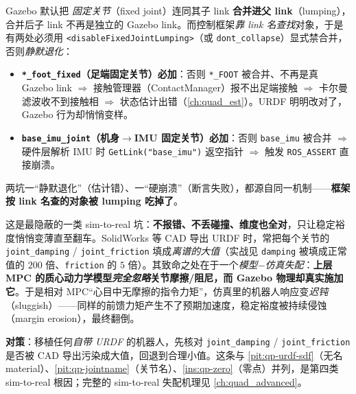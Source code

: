 \begin{pitfall}\label{pit:qp-fixed-lumping}
Gazebo 默认把 \emph{固定关节}（fixed joint）连同其子 link \textbf{合并进父 link}（lumping），合并后子 link 不再是独立的 Gazebo link。而控制框架\emph{靠 link 名查找}对象，于是有两处必须用 \texttt{<disableFixedJointLumping>}（或 \texttt{dont\_collapse}）显式禁合并，否则\emph{静默退化}\cite{sleiman2021unified}：
\begin{itemize}
  \item \textbf{\texttt{*\_foot\_fixed}（足端固定关节）必加}：否则 \texttt{*\_FOOT} 被合并、不再是真 Gazebo link $\Rightarrow$ 接触管理器（ContactManager）报不出足端接触 $\Rightarrow$ 卡尔曼滤波收不到接触相 $\Rightarrow$ 状态估计出错（\cref{ch:quad_est}）。URDF 明明改对了，Gazebo 行为却悄悄变样。
  \item \textbf{\texttt{base\_imu\_joint}（机身$\to$IMU 固定关节）必加}：否则 \texttt{base\_imu} 被合并 $\Rightarrow$ 硬件层解析 IMU 时 \texttt{GetLink("base\_imu")} 返空指针 $\Rightarrow$ 触发 \texttt{ROS\_ASSERT} 直接崩溃。
\end{itemize}
两坑一“静默退化”（估计错）、一“硬崩溃”（断言失败），都源自同一机制——\textbf{框架按 link 名查的对象被 lumping 吃掉了}。
\end{pitfall}

\begin{pitfall}\label{pit:qp-cad-damping}
这是最隐蔽的一类 sim-to-real 坑：\textbf{不报错、不丢碰撞、维度也全对}，只让稳定裕度悄悄变薄直至翻车。SolidWorks 等 CAD 导出 URDF 时，常把每个关节的 \texttt{joint\_damping} / \texttt{joint\_friction} 填成\emph{离谱的大值}（实战见 \texttt{damping} 被填成正常值的 $200$ 倍、\texttt{friction} 的 $5$ 倍）。其致命之处在于一个\emph{模型$-$仿真失配}：\textbf{上层 MPC 的质心动力学模型\emph{完全忽略}关节摩擦/阻尼，而 Gazebo 物理却真实施加它}。于是相对 MPC“心目中无摩擦的指令力矩”，仿真里的机器人响应变\emph{迟钝}（sluggish）——同样的前馈力矩产生不了预期加速度，稳定裕度被持续侵蚀（margin erosion），最终翻倒\cite{sleiman2021unified}。

\noindent\textbf{对策}：移植任何\emph{自带 URDF} 的机器人，先核对 \texttt{joint\_damping} / \texttt{joint\_friction} 是否被 CAD 导出污染成大值，回退到合理小值。这条与 \cref{pit:qp-urdf-sdf}（无名 material）、\cref{pit:qp-jointname}（关节名）、\cref{ins:qp-zero}（零点）并列，是第四类 sim-to-real 根因；完整的 sim-to-real 失配机理见 \cref{ch:quad_advanced}。
\end{pitfall}

